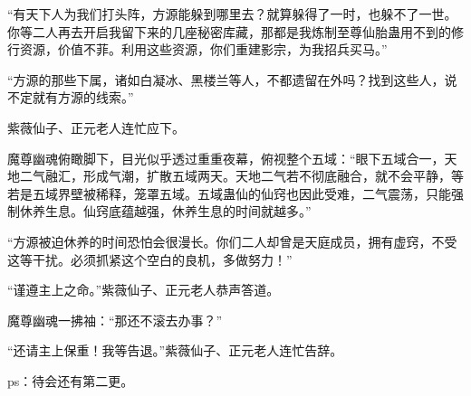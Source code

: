\begin{this_body}
“有天下人为我们打头阵，方源能躲到哪里去？就算躲得了一时，也躲不了一世。你等二人再去开启我留下来的几座秘密库藏，那都是我炼制至尊仙胎蛊用不到的修行资源，价值不菲。利用这些资源，你们重建影宗，为我招兵买马。”

“方源的那些下属，诸如白凝冰、黑楼兰等人，不都遗留在外吗？找到这些人，说不定就有方源的线索。”

紫薇仙子、正元老人连忙应下。

魔尊幽魂俯瞰脚下，目光似乎透过重重夜幕，俯视整个五域：“眼下五域合一，天地二气融汇，形成气潮，扩散五域两天。天地二气若不彻底融合，就不会平静，等若是五域界壁被稀释，笼罩五域。五域蛊仙的仙窍也因此受难，二气震荡，只能强制休养生息。仙窍底蕴越强，休养生息的时间就越多。”

“方源被迫休养的时间恐怕会很漫长。你们二人却曾是天庭成员，拥有虚窍，不受这等干扰。必须抓紧这个空白的良机，多做努力！”

“谨遵主上之命。”紫薇仙子、正元老人恭声答道。

魔尊幽魂一拂袖：“那还不滚去办事？”

“还请主上保重！我等告退。”紫薇仙子、正元老人连忙告辞。

ps：待会还有第二更。

\end{this_body}

